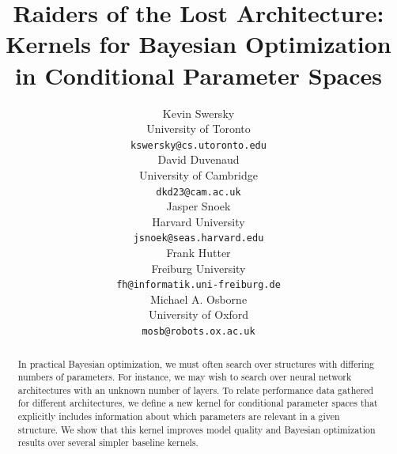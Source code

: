 \documentclass{article}
\newcommand{\note}[1]{}
\begin{document}
\title{Raiders of the Lost Architecture:\\Kernels for Bayesian Optimization in Conditional Parameter Spaces}

\author{
Kevin Swersky \\
University of Toronto \\
{\small \texttt{kswersky@cs.utoronto.edu}} \\
\And
David Duvenaud \\
University of Cambridge \\
{\small \texttt{dkd23@cam.ac.uk}} \\
\And
Jasper Snoek\\
Harvard University \\
{\small \texttt{jsnoek@seas.harvard.edu}} \\
\AND
Frank Hutter  \\
Freiburg University \\
{\small {\tt fh@informatik.uni-freiburg.de}} \\
\And
Michael A. Osborne \\
University of Oxford \\
{\small{\tt mosb@robots.ox.ac.uk}} \\
}




\maketitle
\begin{abstract}
In practical Bayesian optimization, we must often search over structures with differing numbers of parameters.  For instance, we may wish to search over neural network architectures with an unknown number of layers.  To relate performance data gathered for different architectures, we define a new kernel for conditional parameter spaces that explicitly includes information about which parameters are relevant in a given structure. We show that this kernel improves model quality and Bayesian optimization results over several simpler baseline kernels.
\end{abstract}


\end{document}

